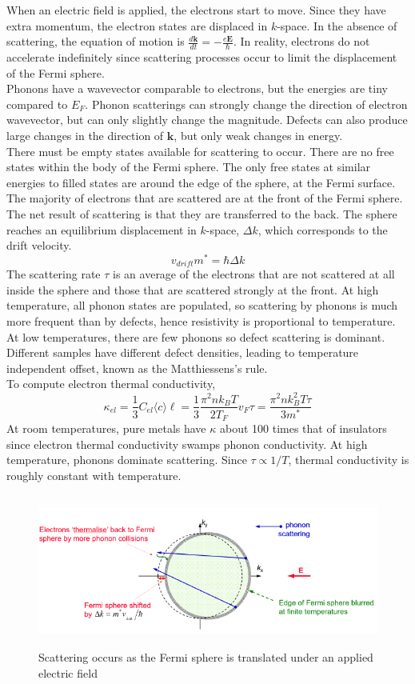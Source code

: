 \documentclass[a4paper]{article}
\begin{document}
\begin{Note}
When an electric field is applied, the electrons start to move. Since they have extra momentum, the electron states are displaced in $k$-space. In the absence of scattering, the equation of motion is $\frac{d\mathbf{k}}{dt}=-\frac{e\mathbf{E}}{\hbar}$. In reality, electrons do not accelerate indefinitely since scattering processes occur to limit the displacement of the Fermi sphere.\\[5pt]
Phonons have a wavevector comparable to electrons, but the energies are tiny compared to $E_F$. Phonon scatterings can strongly change the direction of electron wavevector, but can only slightly change the magnitude. Defects can also produce large changes in the direction of $\mathbf{k}$, but only weak changes in energy.\\[5pt] There must be empty states available for scattering to occur. There are no free states within the body of the Fermi sphere. The only free states at similar energies to filled states are around the edge of the sphere, at the Fermi surface. The majority of electrons that are scattered are at the front of the Fermi sphere. The net result of scattering is that they are transferred to the back. The sphere reaches an equilibrium displacement in $k$-space, $\Delta k$, which corresponds to the drift velocity.
$$v_{drift}m^*=\hbar\Delta k$$
The scattering rate $\tau$ is an average of the electrons that are not scattered at all inside the sphere and those that are scattered strongly at the front. At high temperature, all phonon states are populated, so scattering by phonons is much more frequent than by defects, hence resistivity is proportional to temperature. At low temperatures, there are few phonons so defect scattering is dominant. Different samples have different defect densities, leading to temperature independent offset, known as the Matthiessens's rule.\\[5pt]
To compute electron thermal conductivity,
$$\kappa_{el}=\frac{1}{3}C_{el}\langle c\rangle\ell=\frac{1}{3}\frac{\pi^2nk_BT}{2T_F}v_F\tau=\frac{\pi^2nk_B^2T\tau}{3m^*}$$
At room temperatures, pure metals have $\kappa$ about 100 times that of insulators since electron thermal conductivity swamps phonon conductivity. At high temperature, phonons dominate scattering. Since $\tau\propto 1/T$, thermal conductivity is roughly constant with temperature.
\end{Note}
\begin{figure}[H]
    \centering
    \includegraphics[width=\linewidth, height=5cm]{scatteringfermisphere.PNG}
    \caption{Scattering occurs as the Fermi sphere is translated under an applied electric field}
\end{figure}
\end{document}
